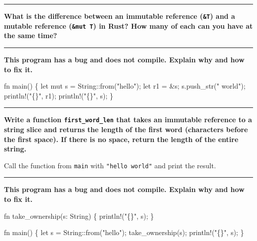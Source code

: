 \documentclass[
  11pt,
]{article}
\newenvironment{Shaded}{}{}
\newcommand{\NormalTok}[1]{#1}
\begin{document}
\begin{center}\rule{0.5\linewidth}{0.5pt}\end{center}

\textbf{What is the difference between an immutable reference
(\texttt{\&T}) and a mutable reference (\texttt{\&mut\ T}) in Rust? How
many of each can you have at the same time?}

\begin{center}\rule{0.5\linewidth}{0.5pt}\end{center}

\textbf{This program has a bug and does not compile. Explain why and how
to fix it.}

\begin{Shaded}
\begin{Highlighting}[]
\NormalTok{fn main() \{}
\NormalTok{    let mut s = String::from("hello");}
\NormalTok{    let r1 = \&s;}
\NormalTok{    s.push\_str(" world");}
\NormalTok{    println!("\{\}", r1);}
\NormalTok{    println!("\{\}", s);}
\NormalTok{\}}
\end{Highlighting}
\end{Shaded}

\begin{center}\rule{0.5\linewidth}{0.5pt}\end{center}

\textbf{Write a function \texttt{first\_word\_len} that takes an
immutable reference to a string slice and returns the length of the
first word (characters before the first space). If there is no space,
return the length of the entire string.}

Call the function from \texttt{main} with \texttt{"hello\ world"} and
print the result.

\begin{Shaded}
\begin{Highlighting}[]



\end{Highlighting}
\end{Shaded}

\begin{center}\rule{0.5\linewidth}{0.5pt}\end{center}

\textbf{This program has a bug and does not compile. Explain why and how
to fix it.}

\begin{Shaded}
\begin{Highlighting}[]
\NormalTok{fn take\_ownership(s: String) \{}
\NormalTok{    println!("\{\}", s);}
\NormalTok{\}}

\NormalTok{fn main() \{}
\NormalTok{    let s = String::from("hello");}
\NormalTok{    take\_ownership(s);}
\NormalTok{    println!("\{\}", s);}
\NormalTok{\}}
\end{Highlighting}
\end{Shaded}
\end{document}
